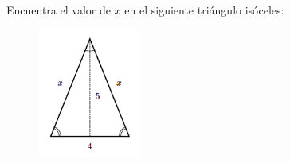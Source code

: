 \question[15] Encuentra el valor de $x$ en el siguiente triángulo isóceles:
\begin{figure}[H]
    \begin{center}
        \includegraphics[width=0.3\textwidth]{../images/pitagoras8.png}
    \end{center}
    \caption{}
    \label{fig:pitagoras8}
\end{figure}